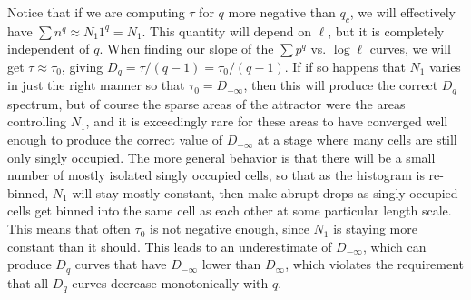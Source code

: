 Notice that if we are computing $\tau$ for $q$ more negative than $q_c$, we will effectively have $\sum n^q \approx N_1 1^q = N_1$.  This quantity will depend on $\ell$, but it is completely independent of $q$.  When finding our slope of the $\sum p^q$ vs. $\log\ell$ curves, we will get $\tau \approx \tau_0$, giving $D_q = \tau/(q-1) = \tau_0/(q-1)$.  If if so happens that $N_1$ varies in just the right manner so that $\tau_0 = D_{-\infty}$, then this will produce the correct $D_q$ spectrum, but of course the sparse areas of the attractor were the areas controlling $N_1$, and it is exceedingly rare for these areas to have converged well enough to produce the correct value of $D_{-\infty}$ at a stage where many cells are still only singly occupied.  The more general behavior is that there will be a small number of mostly isolated singly occupied cells, so that as the histogram is re-binned, $N_1$ will stay mostly constant, then make abrupt drops as singly occupied cells get binned into the same cell as each other at some particular length scale.  This means that often $\tau_0$ is not negative enough, since $N_1$ is staying more constant than it should.  This leads to an underestimate of $D_{-\infty}$, which can produce $D_q$ curves that have $D_{-\infty}$ lower than $D_\infty$, which violates the requirement that all $D_q$ curves decrease monotonically with $q$. %

